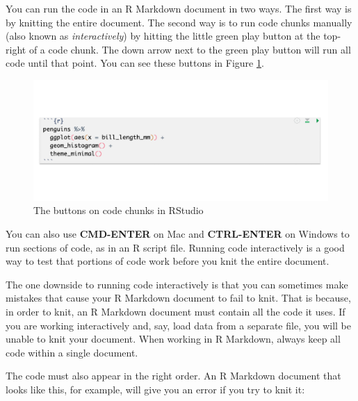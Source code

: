 \documentclass[
]{book}
\begin{document}
You can run the code in an R Markdown document in two ways. The first way is by knitting the entire document. The second way is to run code chunks manually (also known as \emph{interactively}) by hitting the little green play button at the top-right of a code chunk. The down arrow next to the green play button will run all code until that point. You can see these buttons in Figure \ref{fig:code-chunk-buttons-annotated}.

\begin{figure}
\includegraphics[width=1\linewidth]{assets/code-chunk-buttons-annotated} \caption{The buttons on code chunks in RStudio}\label{fig:code-chunk-buttons-annotated}
\end{figure}

You can also use \textbf{CMD-ENTER} on Mac and \textbf{CTRL-ENTER} on Windows to run sections of code, as in an R script file. Running code interactively is a good way to test that portions of code work before you knit the entire document.

The one downside to running code interactively is that you can sometimes make mistakes that cause your R Markdown document to fail to knit. That is because, in order to knit, an R Markdown document must contain all the code it uses. If you are working interactively and, say, load data from a separate file, you will be unable to knit your document. When working in R Markdown, always keep all code within a single document.

The code must also appear in the right order. An R Markdown document that looks like this, for example, will give you an error if you try to knit it:
\end{document}
